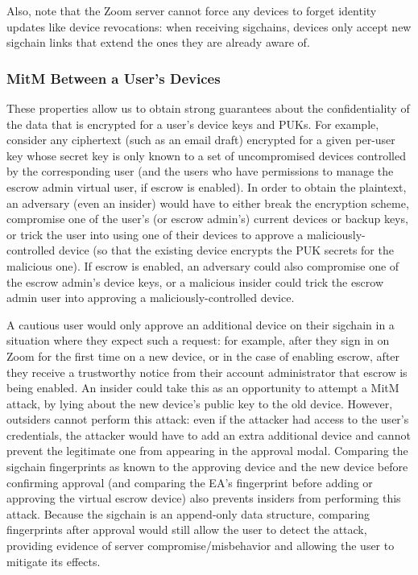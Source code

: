 Also, note that the Zoom server cannot force any devices to forget identity updates like device
revocations: when receiving sigchains, devices only accept new sigchain links that extend the ones
they are already aware of.

\subsubsection{MitM Between a User's Devices}
These properties allow us to obtain strong guarantees about the confidentiality of the data that is
encrypted for a user's device keys and PUKs. For example, consider any ciphertext (such as an email
draft) encrypted for a given per-user key whose secret key is only known to a set of uncompromised
devices controlled by the corresponding user (and the users who have permissions to manage the
escrow admin virtual user, if escrow is enabled). In order to obtain the plaintext, an adversary
(even an insider) would have to either break the encryption scheme, compromise one of the user's (or
escrow admin's) current devices or backup keys, or trick the user into using one of their devices to
approve a maliciously-controlled device (so that the existing device encrypts the PUK secrets for
the malicious one). If escrow is enabled, an adversary could also compromise one of the escrow
admin's device keys, or a malicious insider could trick the escrow admin user into approving a
maliciously-controlled device.

A cautious user would only approve an additional device on their sigchain in a situation where they
expect such a request: for example, after they sign in on Zoom for the first time on a new device,
or in the case of enabling escrow, after they receive a trustworthy notice from their account
administrator that escrow is being enabled. An insider could take this as an opportunity to attempt
a MitM attack, by lying about the new device's public key to the old device. However, outsiders
cannot perform this attack: even if the attacker had access to the user's credentials, the attacker
would have to add an extra additional device and cannot prevent the legitimate one from appearing in
the approval modal. Comparing the sigchain fingerprints as known to the approving device and the new
device before confirming approval (and comparing the EA's fingerprint before adding or approving the
virtual escrow device) also prevents insiders from performing this attack. Because the sigchain is
an append-only data structure, comparing fingerprints after approval would still allow the user to
detect the attack, providing evidence of server compromise/misbehavior and allowing the user to
mitigate its effects.

